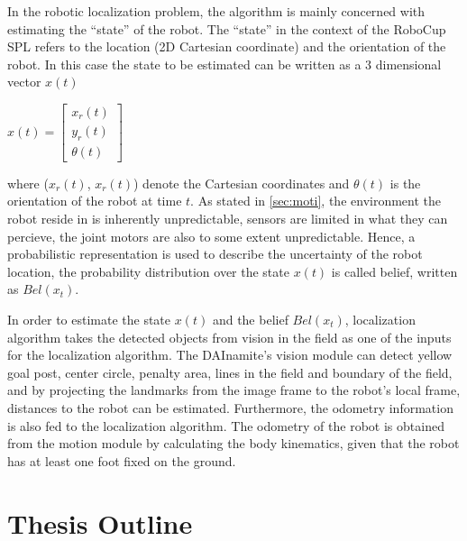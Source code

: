 In the robotic localization problem, the algorithm is mainly concerned with estimating the ``state'' of the robot. The ``state'' in the context of the RoboCup \gls{SPL} refers to the location (2D Cartesian coordinate) and the orientation of the robot. In this case the state to be estimated can be written as a 3 dimensional vector $x(t)$
\begin{center}
$x(t) =
 \begin{bmatrix}
  x_{r}(t) \\
  y_{r}(t) \\
  \theta(t) 
 \end{bmatrix} $ \\
\end{center}
where ($x_{r}(t)$, $x_{r}(t)$) denote the Cartesian coordinates and $\theta(t)$ is the orientation of the robot at time $t$. As stated in \autoref{sec:moti}, the environment the robot reside in is inherently unpredictable, sensors are limited in what they can percieve, the joint motors are also to some extent unpredictable. Hence, a probabilistic representation is used to describe the uncertainty of the robot location, the probability distribution over the state $x(t)$ is called belief, written as $Bel(x_{t})$.
 
In order to estimate the state $x(t)$ and the belief $Bel(x_{t})$, localization algorithm takes the detected objects from vision in the field as one of the inputs for the localization algorithm. The DAInamite's vision module can detect yellow goal post, center circle, penalty area, lines in the field and boundary of the field, and by projecting the landmarks from the image frame to the robot's local frame, distances to the robot can be estimated. Furthermore, the odometry information is also fed to the localization algorithm. The odometry of the robot is obtained from the motion module by calculating the body kinematics, given that the robot has at least one foot fixed on the ground. 


\section{Thesis Outline\label{sec:outline}}

